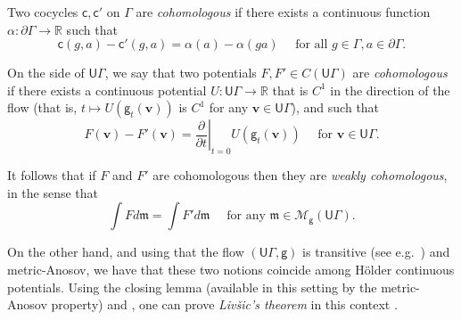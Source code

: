 \documentclass[twoside]{amsart}
\theoremstyle{definition}
\numberwithin{equation}{section}
\numberwithin{theorem}{section}
\newcommand{\msf}[1]{\mathsf{#1}}
\newcommand{\R}{\mathbb{R}}
\newcommand{\calM}{\mathcal{M}}
\newcommand{\frakm}{\mathfrak{m}}
\newcommand{\al}{\alpha}
\newcommand{\G}{\Gamma}
\newcommand{\ep}{\epsilon}
\renewcommand{\epsilon}{\varepsilon}
\newcommand{\gpr}[2]{(#1 \mid#2)}
\newcommand{\ra}{\rightarrow}
\newcommand{\vv}{\mathbf{v}}
\newcommand{\UG}{\msf{U}\G}
\newcommand{\pG}{\partial \G}
\newcommand{\vg}{\msf{g}}
\begin{document}

Two cocycles $\msf{c},\msf{c}'$ on $\G$ are \emph{cohomologous} if there exists a continuous function $\al:\pG \ra \R$ such that \[\msf{c}(g,a)-\msf{c}'(g,a)=\al(a)-\al(ga) \quad \text{ for all }g\in \G,a\in \pG.\]


On the side of $\UG$, we say that two potentials $F,F'\in C(\UG)$ are \emph{cohomologous} if there exists a continuous potential $U:\UG \ra \R$ that is $C^1$ in the direction of the flow (that is, $t\mapsto U(\vg_t(\vv))$ is $C^1$ for any $\vv\in \UG$), and such that
\[F(\vv)-F'(\vv)=\left.\frac{\partial}{\partial t}\right|_{t=0}U(\vg_t(\vv)) \quad \text{ for }\vv\in \UG.\]

It follows that if $F$ and $F'$ are cohomologous then they are \emph{weakly cohomologous}, in the sense that
\[\int{F}d\frakm=\int{F'}d\frakm \quad \text{ for any }\frakm\in \calM_{\vg}(\UG).\]

On the other hand, and using that the flow $(\UG,\vg)$ is transitive (see e.g.~\cite[Proposition~5.1]{BCLS.pressure}) and metric-Anosov, we have that these two notions coincide among H\"older continuous potentials. Using the closing lemma (available in this setting by the metric-Anosov property) and , one can prove \emph{Liv\v{s}ic's theorem} in this context \cite{livsic}.
\end{document}
